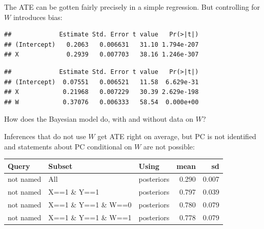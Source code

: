\documentclass[12pt,]{book}
\newenvironment{Shaded}{\begin{snugshade}}{\end{snugshade}}
\newcommand{\DataTypeTok}[1]{\textcolor[rgb]{0.13,0.29,0.53}{#1}}
\newcommand{\KeywordTok}[1]{\textcolor[rgb]{0.13,0.29,0.53}{\textbf{#1}}}
\newcommand{\NormalTok}[1]{#1}
\newcommand{\OperatorTok}[1]{\textcolor[rgb]{0.81,0.36,0.00}{\textbf{#1}}}
\begin{document}
The ATE can be gotten fairly precisely in a simple regression. But controlling for \(W\) introduces bias:

\begin{Shaded}
\end{Shaded}

\begin{verbatim}
##             Estimate Std. Error t value   Pr(>|t|)
## (Intercept)   0.2063   0.006631   31.10 1.794e-207
## X             0.2939   0.007703   38.16 1.246e-307
\end{verbatim}

\begin{Shaded}
\end{Shaded}

\begin{verbatim}
##             Estimate Std. Error t value   Pr(>|t|)
## (Intercept)  0.07551   0.006521   11.58  6.629e-31
## X            0.21968   0.007229   30.39 2.629e-198
## W            0.37076   0.006333   58.54  0.000e+00
\end{verbatim}

How does the Bayesian model do, with and without data on \(W\)?

Inferences that do not use \(W\) get ATE right on average, but PC is not identified and statements about PC conditional on \(W\) are not possible:

\begin{tabular}{l|l|l|r|r}
\hline
Query & Subset & Using & mean & sd\\
\hline
not named & All & posteriors & 0.290 & 0.007\\
\hline
not named & X==1 \& Y==1 & posteriors & 0.797 & 0.039\\
\hline
not named & X==1 \& Y==1 \& W==0 & posteriors & 0.780 & 0.079\\
\hline
not named & X==1 \& Y==1 \& W==1 & posteriors & 0.778 & 0.079\\
\hline
\end{tabular}
\end{document}

